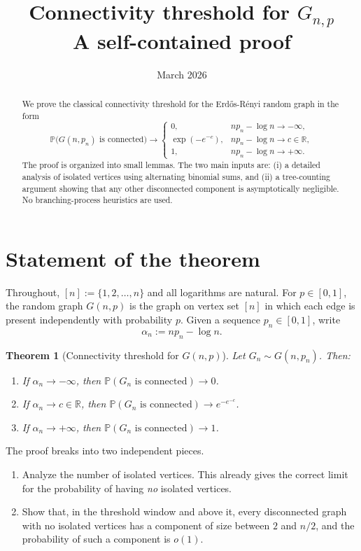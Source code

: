 \documentclass[11pt]{article}
\title{Connectivity threshold for \texorpdfstring{$G_{n,p}$}{G(n,p)}\\[0.35em]
\large A self-contained proof}
\author{}
\date{March 2026}
\newcommand{\PP}{\mathbb{P}}
\theoremstyle{plain}
\newtheorem{theorem}{Theorem}
\theoremstyle{definition}
\begin{document}
\maketitle

\begin{abstract}
We prove the classical connectivity threshold for the Erd\H{o}s-R\'enyi random graph in the form
\[
\PP\bigl(G(n,p_n)\text{ is connected}\bigr)
\to
\begin{cases}
0, & np_n-\log n\to -\infty,\\
\exp(-e^{-c}), & np_n-\log n\to c\in\mathbb{R},\\
1, & np_n-\log n\to +\infty.
\end{cases}
\]
The proof is organized into small lemmas.  The two main inputs are: (i) a detailed analysis of isolated vertices using alternating binomial sums, and (ii) a tree-counting argument showing that any other disconnected component is asymptotically negligible.  No branching-process heuristics are used.
\end{abstract}

\section{Statement of the theorem}

Throughout, $[n] := \{1,2,\dots,n\}$ and all logarithms are natural.  For $p\in[0,1]$, the random graph $G(n,p)$ is the graph on vertex set $[n]$ in which each edge is present independently with probability $p$.  Given a sequence $p_n\in[0,1]$, write
\[
\alpha_n := n p_n - \log n.
\]

\begin{theorem}[Connectivity threshold for $G(n,p)$]\label{thm:conn}
Let $G_n\sim G(n,p_n)$.  Then:
\begin{enumerate}
    \item If $\alpha_n\to -\infty$, then \(\PP(G_n\text{ is connected})\to 0\).
    \item If $\alpha_n\to c\in\mathbb{R}$, then \(\PP(G_n\text{ is connected})\to e^{-e^{-c}}\).
    \item If $\alpha_n\to +\infty$, then \(\PP(G_n\text{ is connected})\to 1\).
\end{enumerate}
\end{theorem}

The proof breaks into two independent pieces.

\begin{enumerate}
    \item Analyze the number of isolated vertices.  This already gives the correct limit for the probability of having \emph{no} isolated vertices.
    \item Show that, in the threshold window and above it, every disconnected graph with no isolated vertices has a component of size between $2$ and $n/2$, and the probability of such a component is $o(1)$.
\end{enumerate}
\end{document}
